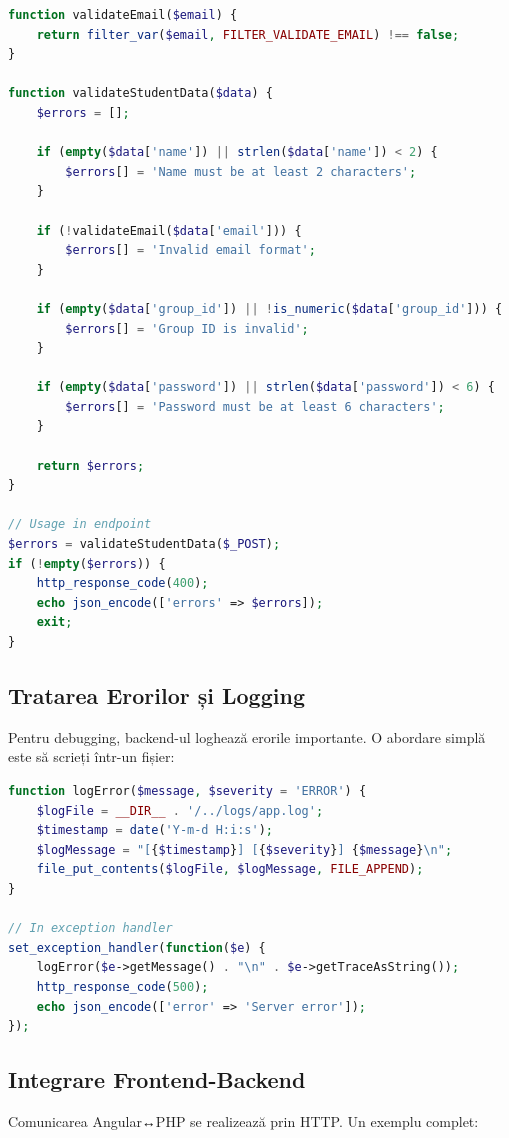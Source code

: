 \begin{lstlisting}[language=PHP]
function validateEmail($email) {
    return filter_var($email, FILTER_VALIDATE_EMAIL) !== false;
}

function validateStudentData($data) {
    $errors = [];

    if (empty($data['name']) || strlen($data['name']) < 2) {
        $errors[] = 'Name must be at least 2 characters';
    }

    if (!validateEmail($data['email'])) {
        $errors[] = 'Invalid email format';
    }

    if (empty($data['group_id']) || !is_numeric($data['group_id'])) {
        $errors[] = 'Group ID is invalid';
    }

    if (empty($data['password']) || strlen($data['password']) < 6) {
        $errors[] = 'Password must be at least 6 characters';
    }

    return $errors;
}

// Usage in endpoint
$errors = validateStudentData($_POST);
if (!empty($errors)) {
    http_response_code(400);
    echo json_encode(['errors' => $errors]);
    exit;
}
\end{lstlisting}

\subsection{Tratarea Erorilor și Logging}

Pentru debugging, backend-ul loghează erorile importante. O abordare simplă este să scrieți într-un fișier:

\begin{lstlisting}[language=PHP]
function logError($message, $severity = 'ERROR') {
    $logFile = __DIR__ . '/../logs/app.log';
    $timestamp = date('Y-m-d H:i:s');
    $logMessage = "[{$timestamp}] [{$severity}] {$message}\n";
    file_put_contents($logFile, $logMessage, FILE_APPEND);
}

// In exception handler
set_exception_handler(function($e) {
    logError($e->getMessage() . "\n" . $e->getTraceAsString());
    http_response_code(500);
    echo json_encode(['error' => 'Server error']);
});
\end{lstlisting}

\subsection{Integrare Frontend-Backend}

Comunicarea Angular↔PHP se realizează prin HTTP. Un exemplu complet:

